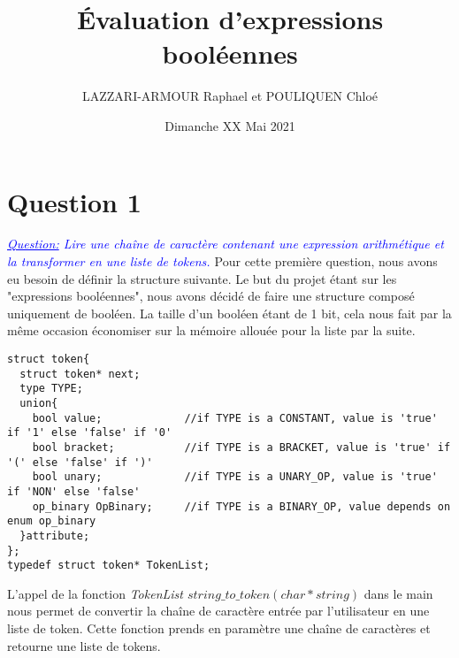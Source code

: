 \documentclass{article}
\title{Évaluation d’expressions booléennes}
\author{LAZZARI-ARMOUR Raphael et POULIQUEN Chloé}
\date{Dimanche XX Mai 2021}
\begin{document}
\maketitle

\section*{Question 1}
\textit{
\textcolor{blue}{
\underline{Question:}
 Lire une chaîne de caractère contenant une expression arithmétique et la transformer en une liste de tokens.
}
}
\newline\newline
Pour cette première question, nous avons eu besoin de définir la structure suivante. Le but du projet étant sur les "expressions booléennes", nous avons décidé de faire une structure composé uniquement de booléen. La taille d'un booléen étant de 1 bit, cela nous fait par la même occasion économiser sur la mémoire allouée pour la liste par la suite. 

\begin{verbatim}
struct token{
  struct token* next;
  type TYPE;
  union{
    bool value;             //if TYPE is a CONSTANT, value is 'true' if '1' else 'false' if '0'
    bool bracket;           //if TYPE is a BRACKET, value is 'true' if '(' else 'false' if ')'
    bool unary;             //if TYPE is a UNARY_OP, value is 'true' if 'NON' else 'false'
    op_binary OpBinary;     //if TYPE is a BINARY_OP, value depends on enum op_binary
  }attribute;
};
typedef struct token* TokenList;
\end{verbatim}

L'appel de la fonction \textit{TokenList $string\_to\_token(char* string)$} dans le main nous permet de convertir la chaîne de caractère entrée par l'utilisateur en une liste de token. Cette fonction prends en paramètre une chaîne de caractères et retourne une liste de tokens. 
\end{document}
